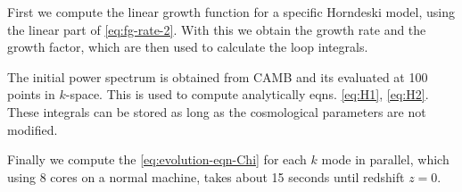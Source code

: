First we compute the linear growth function for a specific Horndeski
model, using the linear part of \ref{eq:fg-rate-2}. With this we
obtain the growth rate and the growth factor, which are then used
to calculate the loop integrals.

The initial power spectrum is obtained from CAMB and its evaluated
at 100 points in $k$-space. This is used to compute analytically
eqns. \ref{eq:H1}, \ref{eq:H2}. These integrals can be stored as
long as the cosmological parameters are not modified.

Finally we compute the \ref{eq:evolution-eqn-Chi} for each $k$ mode
in parallel, which using 8 cores on a normal machine, takes about
15 seconds until redshift $z=0$.

%
%
%
%
%
%


